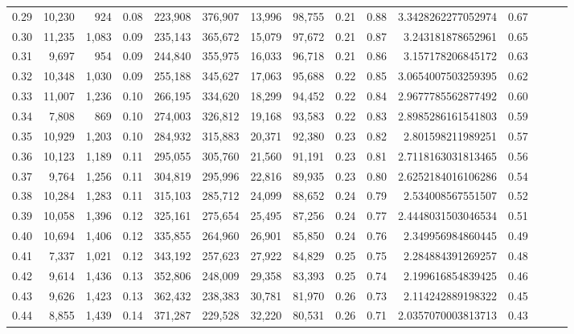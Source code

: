 \begin{tabular}{rrrrrrrrrrrrrrr}
0.29 &  10,230 &    924 &  0.08 &  223,908 &  376,907 &   13,996 &   98,755 &  0.21 &  0.88 &    3.3428262277052974 &      0.67 \\
0.30 &  11,235 &  1,083 &  0.09 &  235,143 &  365,672 &   15,079 &   97,672 &  0.21 &  0.87 &     3.243181878652961 &      0.65 \\
0.31 &   9,697 &    954 &  0.09 &  244,840 &  355,975 &   16,033 &   96,718 &  0.21 &  0.86 &     3.157178206845172 &      0.63 \\
0.32 &  10,348 &  1,030 &  0.09 &  255,188 &  345,627 &   17,063 &   95,688 &  0.22 &  0.85 &    3.0654007503259395 &      0.62 \\
0.33 &  11,007 &  1,236 &  0.10 &  266,195 &  334,620 &   18,299 &   94,452 &  0.22 &  0.84 &    2.9677785562877492 &      0.60 \\
0.34 &   7,808 &    869 &  0.10 &  274,003 &  326,812 &   19,168 &   93,583 &  0.22 &  0.83 &    2.8985286161541803 &      0.59 \\
0.35 &  10,929 &  1,203 &  0.10 &  284,932 &  315,883 &   20,371 &   92,380 &  0.23 &  0.82 &     2.801598211989251 &      0.57 \\
0.36 &  10,123 &  1,189 &  0.11 &  295,055 &  305,760 &   21,560 &   91,191 &  0.23 &  0.81 &    2.7118163031813465 &      0.56 \\
0.37 &   9,764 &  1,256 &  0.11 &  304,819 &  295,996 &   22,816 &   89,935 &  0.23 &  0.80 &    2.6252184016106286 &      0.54 \\
0.38 &  10,284 &  1,283 &  0.11 &  315,103 &  285,712 &   24,099 &   88,652 &  0.24 &  0.79 &     2.534008567551507 &      0.52 \\
0.39 &  10,058 &  1,396 &  0.12 &  325,161 &  275,654 &   25,495 &   87,256 &  0.24 &  0.77 &    2.4448031503046534 &      0.51 \\
0.40 &  10,694 &  1,406 &  0.12 &  335,855 &  264,960 &   26,901 &   85,850 &  0.24 &  0.76 &     2.349956984860445 &      0.49 \\
0.41 &   7,337 &  1,021 &  0.12 &  343,192 &  257,623 &   27,922 &   84,829 &  0.25 &  0.75 &     2.284884391269257 &      0.48 \\
0.42 &   9,614 &  1,436 &  0.13 &  352,806 &  248,009 &   29,358 &   83,393 &  0.25 &  0.74 &     2.199616854839425 &      0.46 \\
0.43 &   9,626 &  1,423 &  0.13 &  362,432 &  238,383 &   30,781 &   81,970 &  0.26 &  0.73 &     2.114242889198322 &      0.45 \\
0.44 &   8,855 &  1,439 &  0.14 &  371,287 &  229,528 &   32,220 &   80,531 &  0.26 &  0.71 &    2.0357070003813713 &      0.43 \\

\end{tabular}
